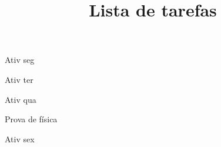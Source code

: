 \title{Lista de tarefas}





\begin{checklist}
  \item{Ativ seg}
  \item{Ativ ter}
  \item{Ativ qua}
  \item{Prova de física}
  \item{Ativ sex}
\end{checklist}


